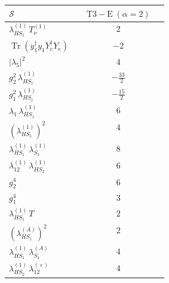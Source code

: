 \documentclass[9pt]{article}
\begin{document}
\begin{longtable}{@{}p{0.31\linewidth}c@{}}
\toprule
$\mathcal{S}$ & $ \mathrm{T3-E}\;(\alpha=2) $ \\
\midrule
$ \lambda_{HS_1}^{(1)}\,T_{\nu}^{(1)} $ & $ 2 $ \\
$ \operatorname{Tr}(y_1^\dagger y_1Y_e^\dagger Y_e) $ & $ -2 $ \\
$ |\lambda_5|^2 $ & $ 4 $ \\
$ g_2^2\,\lambda_{HS_1}^{(1)} $ & $ - \frac{33}{2} $ \\
$ g_1^2\,\lambda_{HS_1}^{(1)} $ & $ - \frac{15}{2} $ \\
$ \lambda_1\,\lambda_{HS_1}^{(1)} $ & $ 6 $ \\
$ \left(\lambda_{HS_1}^{(1)}\right)^2 $ & $ 4 $ \\
$ \lambda_{HS_1}^{(1)}\,\lambda_{S_1}^{(1)} $ & $ 8 $ \\
$ \lambda_{12}^{(1)}\,\lambda_{HS_2}^{(1)} $ & $ 6 $ \\
$ g_2^4 $ & $ 6 $ \\
$ g_1^4 $ & $ 3 $ \\
$ \lambda_{HS_1}^{(1)}\,T $ & $ 2 $ \\
$ \left(\lambda_{HS_1}^{(A)}\right)^2 $ & $ 2 $ \\
$ \lambda_{HS_1}^{(1)}\,\lambda_{S_1}^{(A)} $ & $ 4 $ \\
$ \lambda_{HS_2}^{(1)}\,\lambda_{12}^{(\times)} $ & $ 4 $ \\
\bottomrule
\end{longtable}
\end{document}
